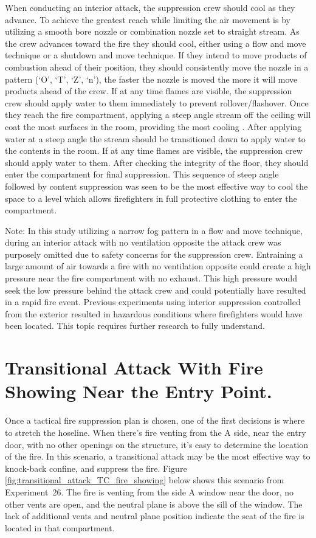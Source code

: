 \documentclass[12pt,oneside]{book}
\begin{document}
When conducting an interior attack, the suppression crew should cool as they advance. To achieve the greatest reach while limiting the air movement is by utilizing a smooth bore nozzle or combination nozzle set to straight stream. As the crew advances toward the fire they should cool, either using a flow and move technique or a shutdown and move technique. If they intend to move products of combustion ahead of their position, they should consistently move the nozzle in a pattern (`O', `T', `Z', `n'), the faster the nozzle is moved the more it will move products ahead of the crew. If at any time flames are visible, the suppression crew should apply water to them immediately to prevent rollover/flashover. Once they reach the fire compartment, applying a steep angle stream off the ceiling will coat the most surfaces in the room, providing the most cooling \cite{Weinchenk_watermapping}. After applying water at a steep angle the stream should be transitioned down to apply water to the contents in the room.  If at any time flames are visible, the suppression crew should apply water to them. After checking the integrity of the floor, they should enter the compartment for final suppression. This sequence of steep angle followed by content suppression was seen to be the most effective way to cool the space to a level which allows firefighters in full protective clothing to enter the compartment.

Note: In this study utilizing a narrow fog pattern in a flow and move technique, during an interior attack with no ventilation opposite the attack crew was purposely omitted due to safety concerns for the suppression crew. Entraining a large amount of air towards a fire with no ventilation opposite could create a high pressure near the fire compartment with no exhaust. This high pressure would seek the low pressure behind the attack crew and could potentially have resulted in a rapid fire event. Previous experiments using interior suppression controlled from the exterior resulted in hazardous conditions where firefighters would have been located. This topic requires further research to fully understand.   

\section{Transitional Attack With Fire Showing Near the Entry Point.} \label{tc:transitional_attack_fire_showing}
Once a tactical fire suppression plan is chosen, one of the first decisions is where to stretch the hoseline. When there's fire venting from the A side, near the entry door, with no other openings on the structure, it's easy to determine the location of the fire. In this scenario, a transitional attack may be the most effective way to knock-back confine, and suppress the fire. Figure \ref{fig:transitional_attack_TC_fire_showing} below shows this scenario from Experiment~26. The fire is venting from the side A window near the door, no other vents are open, and the neutral plane is above the sill of the window. The lack of additional vents and neutral plane position indicate the seat of the fire is located in that compartment.
\end{document}

